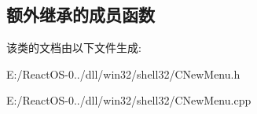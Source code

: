 \subsection*{额外继承的成员函数}


该类的文档由以下文件生成\+:\begin{DoxyCompactItemize}
\item 
E\+:/\+React\+O\+S-\/0../dll/win32/shell32/C\+New\+Menu.\+h\item 
E\+:/\+React\+O\+S-\/0../dll/win32/shell32/C\+New\+Menu.\+cpp\end{DoxyCompactItemize}

